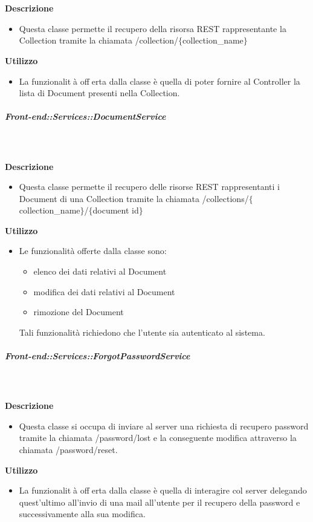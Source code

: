         \textbf{\\ \\ Descrizione} 
          \begin{itemize}
            \item[] Questa classe permette il recupero della risorsa REST rappresentante la Collection tramite la chiamata  /collection/$\{$collection_name$\}$
          \end{itemize}      
        \textbf{Utilizzo}  
          \begin{itemize}
            \item[] La funzionalità offerta dalla classe è quella di poter fornire al Controller la lista di Document presenti nella Collection.
          \end{itemize}
      \subparagraph{Front-end::Services::DocumentService}
        
        \textbf{\\ \\ Descrizione} 
          \begin{itemize}
            \item[] Questa classe permette il recupero delle risorse REST rappresentanti i Document di una Collection tramite la chiamata /collections/$\{$collection_name$\}$/$\{$document id$\}$
          \end{itemize}      
        \textbf{Utilizzo}  
          \begin{itemize}
            \item[] Le funzionalità offerte dalla classe sono: 
\begin{itemize} 
\item elenco dei dati relativi al Document 
\item modifica dei dati relativi al Document
\item rimozione del Document 
\end{itemize} 
Tali funzionalità richiedono che l'utente sia autenticato al sistema.
          \end{itemize}
      \subparagraph{Front-end::Services::ForgotPasswordService}
        
        \textbf{\\ \\ Descrizione} 
          \begin{itemize}
            \item[] Questa classe si occupa di inviare al server una richiesta di recupero password tramite la chiamata /password/lost e la conseguente modifica attraverso la chiamata /password/reset.
          \end{itemize}      
        \textbf{Utilizzo}  
          \begin{itemize}
            \item[] La funzionalità offerta dalla classe è quella di interagire col server delegando quest'ultimo all'invio di una mail all'utente per il recupero della password e successivamente alla sua modifica.
          \end{itemize}
